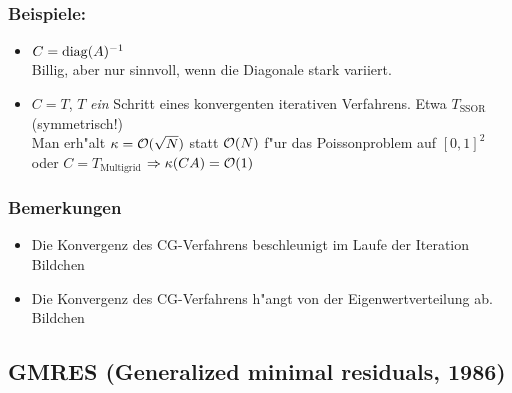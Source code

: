\documentclass{scrartcl}
\begin{document}
\subsubsection*{Beispiele:}
\begin{itemize}
\item $C = \mathrm{diag}(A)^{-1}$ \\ Billig, aber nur sinnvoll, wenn die Diagonale stark variiert.
\item $C = T$, $T$ \emph{ein} Schritt eines konvergenten iterativen Verfahrens. Etwa $T_\mathrm{SSOR}$ (symmetrisch!) \\
Man erh"alt $\kappa = \mathcal{O} (\sqrt{N})$ statt $\mathcal{O} (N)$ f"ur das Poissonproblem auf $[0,1]^2$ \\
oder $C = T_\mathrm{Multigrid}$ $\Rightarrow \kappa( CA ) = \mathcal{O} (1)$
\end{itemize}

\subsubsection*{Bemerkungen}
\begin{itemize}
\item Die Konvergenz des CG-Verfahrens beschleunigt im Laufe der Iteration \\
Bildchen \\
\item Die Konvergenz des CG-Verfahrens h"angt von der Eigenwertverteilung ab. \\ 
Bildchen  
\end{itemize}

\subsection{GMRES (Generalized minimal residuals, 1986)}
\end{document}
